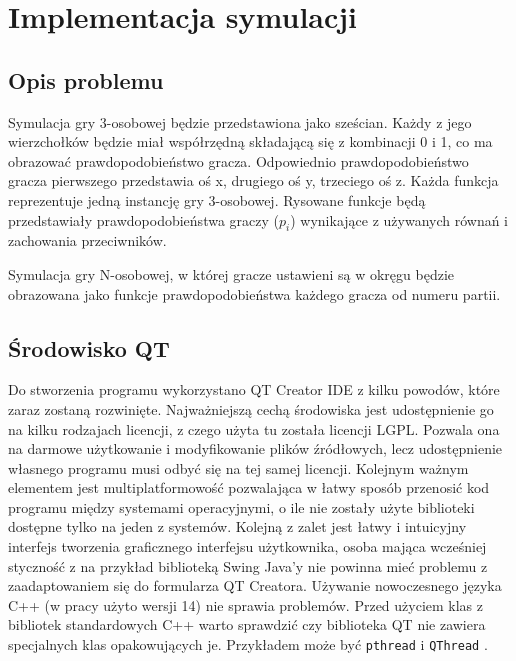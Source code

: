 \chapter{Implementacja symulacji}
\label{cha:implementacja}

\section{Opis problemu}
\label{sec:opis_problemu}
Symulacja gry 3-osobowej będzie przedstawiona jako sześcian. Każdy z jego wierzchołków będzie miał współrzędną składającą się z kombinacji 0 i 1, co ma obrazować prawdopodobieństwo gracza. Odpowiednio prawdopodobieństwo gracza pierwszego przedstawia oś x, drugiego oś y, trzeciego oś z. Każda funkcja reprezentuje jedną instancję gry 3-osobowej. Rysowane funkcje będą przedstawiały prawdopodobieństwa graczy ($p_i$) wynikające z używanych równań i zachowania przeciwników. 

Symulacja gry N-osobowej, w której gracze ustawieni są w okręgu będzie obrazowana jako funkcje prawdopodobieństwa każdego gracza od numeru partii.

\section{Środowisko QT}
\label{sec:qt}
Do stworzenia programu wykorzystano QT Creator IDE z kilku powodów, które zaraz zostaną rozwinięte. Najważniejszą cechą środowiska jest udostępnienie go na kilku rodzajach licencji, z czego użyta tu została licencji LGPL. Pozwala ona na darmowe użytkowanie i modyfikowanie plików źródłowych, lecz udostępnienie własnego programu musi odbyć się na tej samej licencji. Kolejnym ważnym elementem jest multiplatformowość pozwalająca w łatwy sposób przenosić kod programu między systemami operacyjnymi, o ile nie zostały użyte biblioteki dostępne tylko na jeden z systemów. Kolejną z zalet jest łatwy i intuicyjny interfejs tworzenia graficznego interfejsu użytkownika, osoba mająca wcześniej styczność z na przykład biblioteką Swing Java'y nie powinna mieć problemu z zaadaptowaniem się do  formularza QT Creatora. Używanie nowoczesnego języka C++ (w pracy użyto wersji 14) nie sprawia problemów. Przed użyciem klas z bibliotek standardowych C++ warto sprawdzić czy biblioteka QT nie zawiera specjalnych klas opakowujących je. Przykładem może być \texttt{pthread} i \texttt{QThread} \cite{Qt}.

